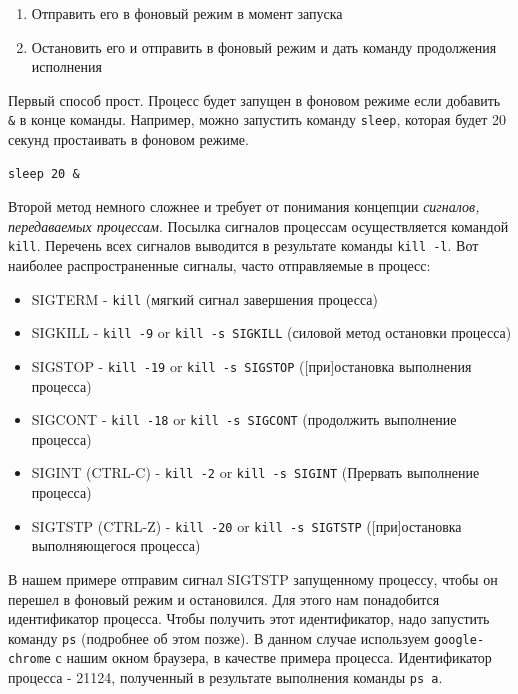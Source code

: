 \documentclass[12pt]{article}
\providecommand{\tightlist}{%
  \setlength{\itemsep}{0pt}\setlength{\parskip}{0pt}}
\begin{document}
\begin{enumerate}
\tightlist
\item
  Отправить его в фоновый режим в момент запуска
\item
  Остановить его и отправить в фоновый режим и дать команду продолжения
  исполнения
\end{enumerate}

Первый способ прост. Процесс будет запущен в фоновом режиме если
добавить \texttt{\&} в конце команды. Например, можно запустить команду
\texttt{sleep}, которая будет 20 секунд простаивать в фоновом режиме.

\begin{verbatim}
sleep 20 &
\end{verbatim}

Второй метод немного сложнее и требует от понимания концепции
\emph{сигналов, передаваемых процессам}. Посылка сигналов процессам
осуществляется командой \texttt{kill}. Перечень всех сигналов выводится
в результате команды \texttt{kill\ -l}. Вот наиболее распространенные
сигналы, часто отправляемые в процесс:

\begin{itemize}
\tightlist
\item
  SIGTERM - \texttt{kill} (мягкий сигнал завершения процесса)
\item
  SIGKILL - \texttt{kill\ -9} or \texttt{kill\ -s\ SIGKILL} (силовой
  метод остановки процесса)
\item
  SIGSTOP - \texttt{kill\ -19} or \texttt{kill\ -s\ SIGSTOP}
  ({[}при{]}остановка выполнения процесса)
\item
  SIGCONT - \texttt{kill\ -18} or \texttt{kill\ -s\ SIGCONT} (продолжить
  выполнение процесса)
\item
  SIGINT (CTRL-C) - \texttt{kill\ -2} or \texttt{kill\ -s\ SIGINT}
  (Прервать выполнение процесса)
\item
  SIGTSTP (CTRL-Z) - \texttt{kill\ -20} or \texttt{kill\ -s\ SIGTSTP}
  ({[}при{]}остановка выполняющегося процесса)
\end{itemize}

В нашем примере отправим сигнал SIGTSTP запущенному процессу, чтобы он
перешел в фоновый режим и остановился. Для этого нам понадобится
идентификатор процесса. Чтобы получить этот идентификатор, надо
запустить команду \texttt{ps} (подробнее об этом позже). В данном случае
используем \texttt{google-chrome} с нашим окном браузера, в качестве
примера процесса. Идентификатор процесса - 21124, полученный в
результате выполнения команды \texttt{ps\ a}.
\end{document}
